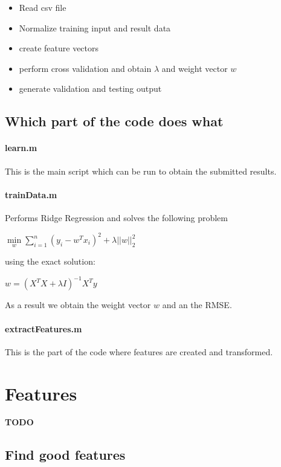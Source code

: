 \documentclass[a4paper, 11pt]{article}
\begin{document}
\begin{itemize}
\item Read csv file
\item Normalize training input and result data
\item create feature vectors
\item perform cross validation and obtain $\lambda$ and weight vector $w$
\item generate validation and testing output
\end{itemize}

\subsection{Which part of the code does what}

\paragraph{learn.m}
This is the main script which can be run to obtain the submitted results.
\paragraph{trainData.m}
Performs Ridge Regression and solves the following problem

$ \min \limits_w \sum \limits_{i=1}^n \left(y_i - w^Tx_i\right)^2 + \lambda ||w||_2^2$

using the exact solution:


$ w = \left(X^T X + \lambda I   \right)^{-1} X^T y$

As a result we obtain the weight vector $w$ and an the RMSE.

\paragraph{extractFeatures.m}

This is the part of the code where features are created and transformed.


\section{Features}

\textbf{TODO}

\subsection{Find good features}
\label{subsec:findgoodfeatures}
\end{document}
